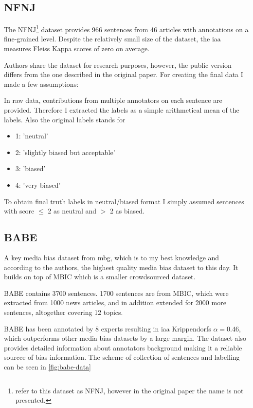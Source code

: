 \subsection{NFNJ}
The NFNJ\footnote{\cite{farber2020multidimensional} refer to this dataset as NFNJ, however in the original paper the name is not presented.} dataset provides 966 sentences from 46 articles with annotations on a fine-grained level. Despite the relatively small size of the dataset, the \Gls{iaa} measures Fleiss Kappa scores of zero on average.

Authors share the dataset for research purposes, however, the public version differs from the one described in the original paper. For creating the final data I made a few assumptions:

In raw data, contributions from multiple annotators on each sentence are provided. Therefore I extracted the labels as a simple arithmetical mean of the labels. Also the original labels stands for 
\begin{itemize}
    \item 1: 'neutral'
    \item 2: 'slightly biased but acceptable'
    \item 3: 'biased'
    \item 4: 'very biased'
\end{itemize}
To obtain final truth labels in neutral/biased format I simply assumed sentences with score $\leq$ 2 as neutral and $>$ 2 as biased.




\subsection{BABE}
A key media bias dataset from \Gls{mbg}, which is to my best knowledge and according to the authors, the highest quality media bias dataset to this day. It builds on top of MBIC \cite{Spinde2021MBIC} which is a smaller crowdsourced dataset.

BABE contains 3700 sentences. 1700 sentences are from MBIC, which were extracted from 1000 news articles, and in addition extended for 2000 more sentences, altogether covering 12 topics.

BABE has been annotated by 8 experts resulting in \gls{iaa} Krippendorfs $\alpha = 0.46$, which outperforms other media bias datasets by a large margin. The dataset also provides detailed information about annotators background making it a reliable sourcce of bias information. The scheme of collection of sentences and labelling can be seen in \ref{fig:babe-data}

